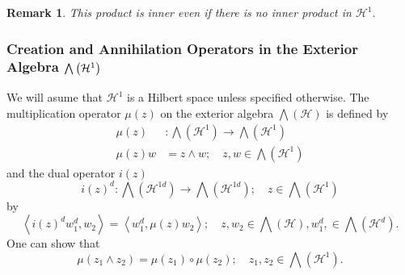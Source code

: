 \documentclass[aps,preprint]{revtex4}%
\newtheorem{remark}[theorem]{Remark}
\begin{document}
\begin{remark}
This product is inner even if there is no inner product in $\mathcal{H}^{1}.$
\end{remark}

\subsubsection{Creation and Annihilation Operators in the Exterior Algebra $%
{\textstyle\protect\bigwedge}
\left(  \mathcal{H}^{1}\right)  $}

We will asume that $\mathcal{H}^{1}$ is a Hilbert space unless specified
otherwise. The multiplication operator $\mu\left(  z\right)  $ on the exterior
algebra $%
{\textstyle\bigwedge}
\left(  \mathcal{H}\right)  $ is defined by
\begin{align}
\mu\left(  z\right)   &  :%
{\textstyle\bigwedge}
\left(  \mathcal{H}^{1}\right)  \rightarrow%
{\textstyle\bigwedge}
\left(  \mathcal{H}^{1}\right) \\
\mu\left(  z\right)  w  &  =z\wedge w;\quad z,w\in%
{\textstyle\bigwedge}
\left(  \mathcal{H}^{1}\right)
\end{align}
and the dual operator $i\left(  z\right)  $%
\begin{equation}
i\left(  z\right)  ^{d}:%
{\textstyle\bigwedge}
\left(  \mathcal{H}^{1d}\right)  \rightarrow%
{\textstyle\bigwedge}
\left(  \mathcal{H}^{1d}\right)  ;\quad z\in%
{\textstyle\bigwedge}
\left(  \mathcal{H}^{1}\right)
\end{equation}
by
\begin{equation}
\left\langle i\left(  z\right)  ^{d}w_{1}^{d},w_{2}\right\rangle =\left\langle
w_{1}^{d},\mu\left(  z\right)  w_{2}\right\rangle ;\quad z,w_{2}\in%
{\textstyle\bigwedge}
\left(  \mathcal{H}\right)  ,w_{1}^{d},\in%
{\textstyle\bigwedge}
\left(  \mathcal{H}^{d}\right)  .
\end{equation}
One can show that
\begin{equation}
\mu\left(  z_{1}\wedge z_{2}\right)  =\mu\left(  z_{1}\right)  \circ\mu\left(
z_{2}\right)  ;\quad z_{1},z_{2}\in%
{\textstyle\bigwedge}
\left(  \mathcal{H}^{1}\right)  .
\end{equation}
\end{document}
